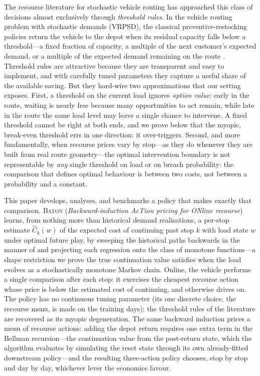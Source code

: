 \documentclass[preprint,authoryear,12pt]{elsarticle}
\theoremstyle{definition}
\theoremstyle{remark}
\begin{document}
The recourse literature for stochastic vehicle routing has approached
this class of decisions almost exclusively through \emph{threshold
rules}. In the vehicle routing problem with stochastic demands (VRPSD),
the classical preventive-restocking policies return the vehicle to the
depot when its residual capacity falls below a threshold---a fixed
fraction of capacity, a multiple of the next customer's expected demand,
or a multiple of the expected demand remaining on the route
\citep{yang2000stochastic,salavati2019rule}. Threshold rules are
attractive because they are transparent and easy to implement, and with
carefully tuned parameters they capture a useful share of the available
saving. But they hard-wire two approximations that our setting exposes.
First, a threshold on the current load ignores \emph{option value}: early
in the route, waiting is nearly free because many opportunities to act
remain, while late in the route the same load level may leave a single
chance to intervene. A fixed threshold cannot be right at both ends, and
we prove below that the myopic, break-even threshold errs in one
direction: it over-triggers.
Second, and more fundamentally, when recourse prices vary by stop---as
they do whenever they are built from real route geometry---the optimal
intervention boundary is not representable by \emph{any} single threshold
on load or on breach probability: the comparison that defines optimal
behaviour is between two costs, not between a probability and a constant.

This paper develops, analyses, and benchmarks a policy that makes
exactly that comparison. \textsc{Baton} (\emph{Backward-induction
AcTion pricing for ONline recourse}) learns, from nothing more than
historical demand realisations, a per-stop estimate
$\widehat C_k(w)$ of the expected cost of continuing past stop $k$ with
load state $w$ under optimal future play, by sweeping the historical
paths backwards in the manner of \citet{longstaff2001valuing} and
projecting each regression onto the class of monotone functions---a
shape restriction we prove the true continuation value satisfies when
the load evolves as a stochastically monotone Markov chain. Online, the
vehicle performs a single comparison after each stop: it exercises the
cheapest recourse action whose price is below the estimated cost of
continuing, and otherwise drives on. The policy has no continuous tuning
parameter (its one discrete choice, the recourse menu, is made on the
training days);
the threshold rules of the literature are recovered as its myopic
degeneration. The same backward induction prices a menu of recourse
actions: adding the depot return requires one extra term in the Bellman
recursion---the continuation value from the post-return state, which
the algorithm evaluates by simulating the reset state through its own
already-fitted downstream policy---and the resulting three-action
policy chooses, stop by stop and day by day, whichever lever the
economics favour.
\end{document}
